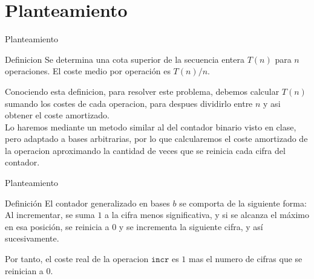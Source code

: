\documentclass[aspectratio=169]{beamer}
\begin{document}
\section{Planteamiento}
\begin{frame}{Planteamiento}
    \begin{exampleblock}{Definicion}
        Se determina una cota superior de la secuencia entera $T(n)$ para $n$ operaciones. El coste medio por operación es $T(n)/n$.
    \end{exampleblock}
    Conociendo esta definicion, para resolver este problema, debemos calcular $T(n)$ sumando los costes de cada operacion, para despues dividirlo entre $n$ y asi obtener el coste amortizado.\\
    Lo haremos mediante un metodo similar al del contador binario visto en clase, pero adaptado a bases arbitrarias, por lo que calcularemos el coste amortizado de la operacion aproximando la cantidad de veces que se reinicia cada cifra del contador.
\end{frame}
\begin{frame}{Planteamiento}
    \begin{exampleblock}{Definición}
        El contador generalizado en bases $b$ se comporta de la siguiente forma:\\
        Al incrementar, se suma $1$ a la cifra menos significativa, y si se alcanza el máximo en esa posición, se reinicia a $0$ y se incrementa la siguiente cifra, y así sucesivamente.
    \end{exampleblock}
    Por tanto, el coste real de la operacion $\texttt{incr}$ es $1$ mas el numero de cifras que se reinician a $0$.
\end{frame}
\end{document}

